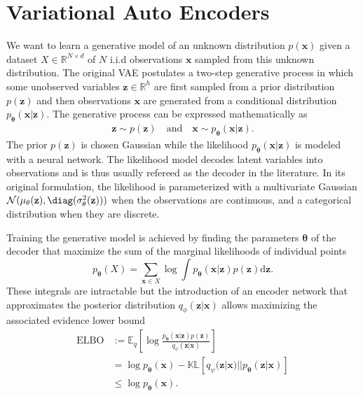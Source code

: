 \section{Variational Auto Encoders}
We want to learn a generative model of an unknown distribution $p(\mathbf{x})$ given a dataset $X \in \mathbb{R}^{N\times d}$ of $N$ i.i.d observations $\mathbf{x}$ sampled from this unknown distribution.
The original VAE postulates a two-step generative process in which some unobserved variables $\mathbf{z} \in \mathbb{R}^h$ are first sampled from a prior distribution $p(\mathbf{z})$ and then observations $\mathbf{x}$ are generated from a conditional distribution $p_\mathbf{\theta}(\mathbf{x}|\mathbf{z})$. The generative process can be expressed mathematically as
\begin{align}
     \mathbf{z} \sim p(\mathbf{z}) \quad \text{and} \quad \mathbf{x} \sim p_\mathbf{\theta}(\mathbf{x}|\mathbf{z}).
\end{align}
The prior $p(\mathbf{z})$ is chosen Gaussian while the likelihood $p_\mathbf{\theta}(\mathbf{x}|\mathbf{z})$ is modeled with a neural network. The likelihood model decodes latent variables into observations and is thus usually refereed as the decoder in the literature. In its original formulation, the likelihood is parameterized with a multivariate Gaussian $\mathcal{N}(\mathbf{\mu_\theta}(\mathbf{z}), \diag(\sigma_\theta^2(\mathbf{z})))$ when the observations are continuous, and a categorical distribution when they are discrete.

Training the generative model is achieved by finding the parameters $\mathbf{\theta}$ of the decoder that maximize the sum of the marginal likelihoods of individual points $$p_\mathbf{\theta}(X)= \sum_{\mathbf{x}\in X}\log \int p_\mathbf{\theta}(\mathbf{x}|\mathbf{z}) p(\mathbf{z}) \text{d}\mathbf{z}.$$
These integrals are intractable but the introduction of an encoder network that approximates the posterior distribution $q_\phi(\mathbf{z}|\mathbf{x})$ allows maximizing the associated evidence lower bound
\begin{align}
    \operatorname{ELBO}&:=\mathbb{E}_q\left[\log \frac{p_\mathbf{\theta} (\mathbf{x}|\mathbf{z}) p(\mathbf{z})}{q_\psi(\mathbf{z}|\mathbf{x})} \right]\label{eq:ELBO_VAE}\\
    &=\log p_\mathbf{\theta}(\mathbf{x}) - \mathbb{KL}\left[q_\psi(\mathbf{z}|\mathbf{x})||p_\mathbf{\theta} (\mathbf{z}|\mathbf{x})\right]\\
    &\leq \log p_\mathbf{\theta}(\mathbf{x}).
\end{align}

